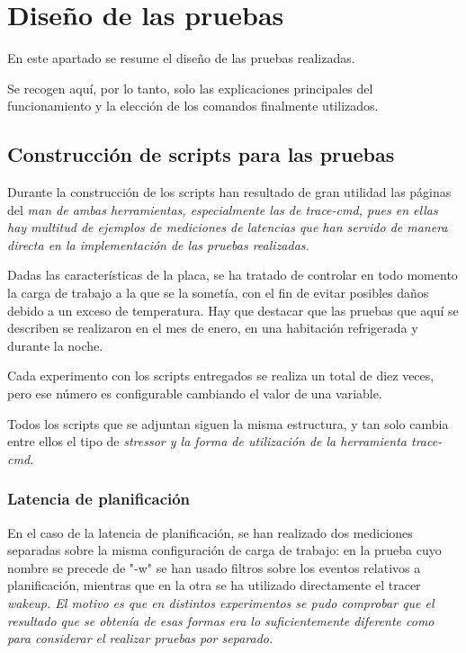 \documentclass[../main.tex]{subfiles}
\begin{document}
\section{Diseño de las pruebas}

En este apartado se resume el diseño de las pruebas realizadas.

Se recogen aquí, por lo tanto, solo las explicaciones principales del funcionamiento y la elección de los comandos finalmente utilizados.

\subsection{Construcción de scripts para las pruebas}

Durante la construcción de los scripts han resultado de gran utilidad las páginas del \it{man} de ambas herramientas, especialmente las de \it{trace-cmd}, pues en ellas hay multitud de ejemplos de mediciones de latencias que han servido de manera directa en la implementación de las pruebas realizadas.

Dadas las características de la placa, se ha tratado de controlar en todo momento la carga de trabajo a la que se la sometía, con el fin de evitar posibles daños debido a un exceso de temperatura. Hay que destacar que las pruebas que aquí se describen se realizaron en el mes de enero, en una habitación refrigerada y durante la noche.

Cada experimento con los scripts entregados se realiza un total de diez veces, pero ese número es configurable cambiando el valor de una variable.

Todos los scripts que se adjuntan siguen la misma estructura, y tan solo cambia entre ellos el tipo de \it{stressor} y la forma de utilización de la herramienta \it{trace-cmd}.

\subsubsection{Latencia de planificación}

En el caso de la latencia de planificación, se han realizado dos mediciones separadas sobre la misma configuración de carga de trabajo: en la prueba cuyo nombre se precede de "-w" se han usado filtros sobre los eventos relativos a planificación, mientras que en la otra se ha utilizado directamente el tracer \it{wakeup}. El motivo es que en distintos experimentos se pudo comprobar que el resultado que se obtenía de esas formas era lo suficientemente diferente como para considerar el realizar pruebas por separado.
\end{document}
